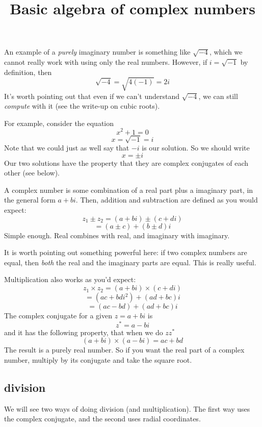 \documentclass[11pt, oneside]{article}   	%
\title{Basic algebra of complex numbers}
\date{}							%
\begin{document}
\maketitle
\Large
\noindent
An example of a \emph{purely} imaginary number is something like $\sqrt{-4}$, which we cannot really work with using only the real numbers.  However, if $i = \sqrt{-1}$ by definition, then
\[ \sqrt{-4} = \sqrt{4(-1)} = 2i \]
It's worth pointing out that even if we can't understand $\sqrt{-4}$, we can still \emph{compute} with it (see the write-up on cubic roots).

For example, consider the equation
\[ x^2 + 1 = 0 \]
\[ x = \sqrt{-1} = i \]
Note that we could just as well say that $-i$ is our solution.  So we should write
\[ x = \pm i \]
Our two solutions have the property that they are complex conjugates of each other (see below).

A complex number is some combination of a real part plus a imaginary part, in the general form $a + bi$.  Then, addition and subtraction are defined as you would expect:
\[ z_1 \pm z_2 = (a + bi) \pm (c + di) \]
\[ = (a \pm c) + (b \pm d)i \]
Simple enough.  Real combines with real, and imaginary with imaginary.  

It is worth pointing out something powerful here:  if two complex numbers are equal, then \emph{both} the real and the imaginary parts are equal.  This is really useful.

Multiplication also works as you'd expect:
\[ z_1 \times z_2 = (a + bi) \times (c + di) \]
\[ = (ac + bdi^2) + (ad + bc)i \]
\[ = (ac - bd) + (ad + bc)i \]
The complex conjugate for a given $z = a + bi$ is
\[  z^* = a - bi \]
and it has the following property, that when we do $z z^*$
\[ (a + bi) \times (a - bi) = ac + bd \]
The result is a purely real number.  So if you want the real part of a complex number, multiply by its conjugate and take the square root.
\subsection*{division}
We will see two ways of doing division (and multiplication).  The first way uses the complex conjugate, and the second uses radial coordinates.
\end{document}
